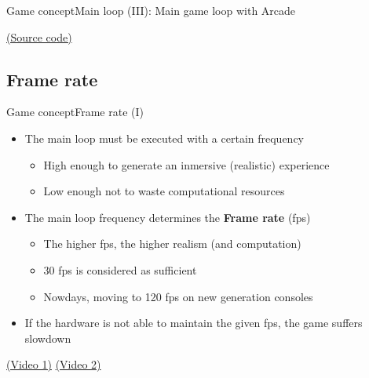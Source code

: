 \documentclass[10pt,compress]{beamer} %
\begin{document}
\begin{frame}[plain]{Game concept}{Main loop (III): Main game loop with Arcade}
	\vspace{-0.2cm}
	\begin{block}{}
		\vspace{-0.2cm}
		
	\end{block}

	\href{https://github.com/pvcraven/arcade/blob/master/arcade/application.py\#L36}{(Source code)}
\end{frame}

\subsection[Frame rate]{Frame rate}
\begin{frame}{Game concept}{Frame rate (I)}
	\begin{itemize}
	\item The main loop must be executed with a certain frequency
		\begin{itemize}
		\item High enough to generate an inmersive (realistic) experience
		\item Low enough not to waste computational resources
		\end{itemize}
	\item The main loop frequency determines the \textbf{Frame rate} (fps)
		\begin{itemize}
		\item The higher fps, the higher realism (and computation)
		\item 30 fps is considered as sufficient
		\item Nowdays, moving to 120 fps on new generation consoles
		\end{itemize}
	\item If the hardware is not able to maintain the given fps, the game suffers slowdown
	\end{itemize}
	\href{https://youtu.be/PLhPvS0hZSs?t=1m21s}{(Video 1)} \href{https://youtu.be/AwnQ6qF8Ots?t=1m38s}{(Video 2)} 
\end{frame}
\end{document}
